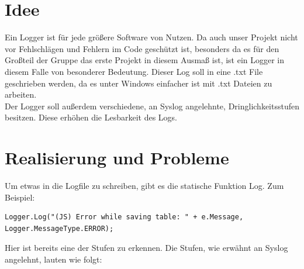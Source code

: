 \documentclass[12pt,a4paper]{report}
\begin{document}
\begin{onehalfspace}
\section{Idee}
Ein Logger ist für jede größere Software von Nutzen. Da auch unser Projekt nicht vor Fehlschlägen und Fehlern im Code geschützt ist, besonders da es für den Großteil der Gruppe das erste Projekt in diesem Ausmaß ist, ist ein Logger in diesem Falle von besonderer Bedeutung. Dieser Log soll in eine .txt File geschrieben werden, da es unter Windows einfacher ist mit .txt Dateien zu arbeiten.\\
Der Logger soll außerdem verschiedene, an Syslog angelehnte, Dringlichkeitsstufen besitzen. Diese erhöhen die Lesbarkeit des Logs.

\section{Realisierung und Probleme}
Um etwas in die Logfile zu schreiben, gibt es die statische Funktion Log. Zum Beispiel:
\begin{lstlisting}
Logger.Log("(JS) Error while saving table: " + e.Message, Logger.MessageType.ERROR);
\end{lstlisting}
Hier ist bereits eine der Stufen zu erkennen. Die Stufen, wie erwähnt an Syslog angelehnt, lauten wie folgt:


\end{onehalfspace}
\end{document}
